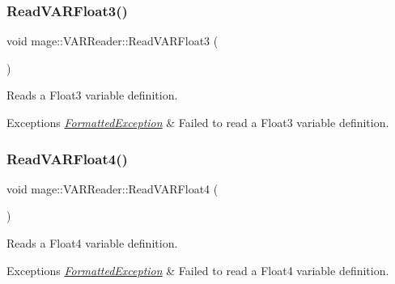 \subsubsection{\texorpdfstring{Read\+V\+A\+R\+Float3()}{ReadVARFloat3()}}
{\footnotesize\ttfamily void mage\+::\+V\+A\+R\+Reader\+::\+Read\+V\+A\+R\+Float3 (\begin{DoxyParamCaption}{ }\end{DoxyParamCaption})\hspace{0.3cm}{\ttfamily [private]}}

Reads a Float3 variable definition.


\begin{DoxyExceptions}{Exceptions}
{\em \hyperlink{classmage_1_1_formatted_exception}{Formatted\+Exception}} & Failed to read a Float3 variable definition. \\
\hline
\end{DoxyExceptions}
\hypertarget{classmage_1_1_v_a_r_reader_a6f14f9f9696e32090f262682c519bc10}{}\label{classmage_1_1_v_a_r_reader_a6f14f9f9696e32090f262682c519bc10} 
\subsubsection{\texorpdfstring{Read\+V\+A\+R\+Float4()}{ReadVARFloat4()}}
{\footnotesize\ttfamily void mage\+::\+V\+A\+R\+Reader\+::\+Read\+V\+A\+R\+Float4 (\begin{DoxyParamCaption}{ }\end{DoxyParamCaption})\hspace{0.3cm}{\ttfamily [private]}}

Reads a Float4 variable definition.


\begin{DoxyExceptions}{Exceptions}
{\em \hyperlink{classmage_1_1_formatted_exception}{Formatted\+Exception}} & Failed to read a Float4 variable definition. \\
\hline
\end{DoxyExceptions}
\hypertarget{classmage_1_1_v_a_r_reader_a9b78c642785ef8a9c487ba9cc84842c4}{}\label{classmage_1_1_v_a_r_reader_a9b78c642785ef8a9c487ba9cc84842c4} 
